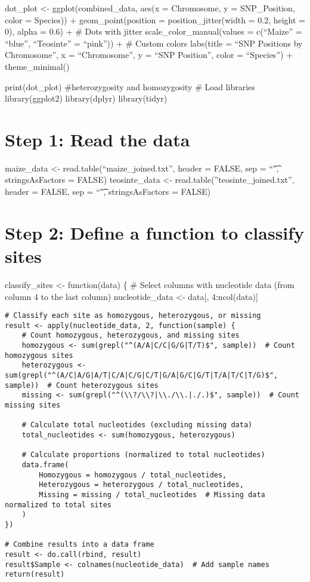 \documentclass[
]{article}
\begin{document}
dot\_plot \textless- ggplot(combined\_data, aes(x = Chromosome, y =
SNP\_Position, color = Species)) + geom\_point(position =
position\_jitter(width = 0.2, height = 0), alpha = 0.6) + \# Dots with
jitter scale\_color\_manual(values = c(``Maize'' = ``blue'',
``Teosinte'' = ``pink'')) + \# Custom colors labs(title = ``SNP
Positions by Chromosome'', x = ``Chromosome'', y = ``SNP Position'',
color = ``Species'') + theme\_minimal()

print(dot\_plot) \#heterozygosity and homozygosity \# Load libraries
library(ggplot2) library(dplyr) library(tidyr)

\section{Step 1: Read the data}\label{step-1-read-the-data-1}

maize\_data \textless- read.table(``maize\_joined.txt'', header = FALSE,
sep = ``\t", stringsAsFactors = FALSE) teosinte\_data \textless-
read.table(''teosinte\_joined.txt'', header = FALSE, sep = ``\t",
stringsAsFactors = FALSE)

\section{Step 2: Define a function to classify
sites}\label{step-2-define-a-function-to-classify-sites}

classify\_sites \textless- function(data) \{ \# Select columns with
nucleotide data (from column 4 to the last column) nucleotide\_data
\textless- data{[}, 4:ncol(data){]}

\begin{verbatim}
# Classify each site as homozygous, heterozygous, or missing
result <- apply(nucleotide_data, 2, function(sample) {
    # Count homozygous, heterozygous, and missing sites
    homozygous <- sum(grepl("^(A/A|C/C|G/G|T/T)$", sample))  # Count homozygous sites
    heterozygous <- sum(grepl("^(A/C|A/G|A/T|C/A|C/G|C/T|G/A|G/C|G/T|T/A|T/C|T/G)$", sample))  # Count heterozygous sites
    missing <- sum(grepl("^(\\?/\\?|\\./\\.|./.)$", sample))  # Count missing sites
    
    # Calculate total nucleotides (excluding missing data)
    total_nucleotides <- sum(homozygous, heterozygous)
    
    # Calculate proportions (normalized to total nucleotides)
    data.frame(
        Homozygous = homozygous / total_nucleotides,
        Heterozygous = heterozygous / total_nucleotides,
        Missing = missing / total_nucleotides  # Missing data normalized to total sites
    )
})

# Combine results into a data frame
result <- do.call(rbind, result)
result$Sample <- colnames(nucleotide_data)  # Add sample names
return(result)
\end{verbatim}
\end{document}
